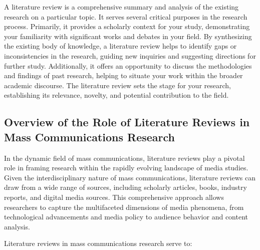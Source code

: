 \documentclass[
]{book}
\begin{document}
A literature review is a comprehensive summary and analysis of the existing research on a particular topic. It serves several critical purposes in the research process. Primarily, it provides a scholarly context for your study, demonstrating your familiarity with significant works and debates in your field. By synthesizing the existing body of knowledge, a literature review helps to identify gaps or inconsistencies in the research, guiding new inquiries and suggesting directions for further study. Additionally, it offers an opportunity to discuss the methodologies and findings of past research, helping to situate your work within the broader academic discourse. The literature review sets the stage for your research, establishing its relevance, novelty, and potential contribution to the field.

\hypertarget{overview-of-the-role-of-literature-reviews-in-mass-communications-research}{%
\subsection*{Overview of the Role of Literature Reviews in Mass Communications Research}\label{overview-of-the-role-of-literature-reviews-in-mass-communications-research}}

In the dynamic field of mass communications, literature reviews play a pivotal role in framing research within the rapidly evolving landscape of media studies. Given the interdisciplinary nature of mass communications, literature reviews can draw from a wide range of sources, including scholarly articles, books, industry reports, and digital media sources. This comprehensive approach allows researchers to capture the multifaceted dimensions of media phenomena, from technological advancements and media policy to audience behavior and content analysis.

Literature reviews in mass communications research serve to:
\end{document}
